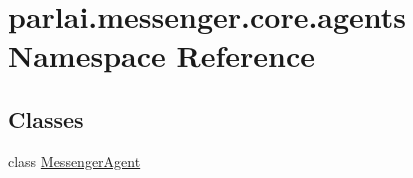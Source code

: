 \hypertarget{namespaceparlai_1_1messenger_1_1core_1_1agents}{}\section{parlai.\+messenger.\+core.\+agents Namespace Reference}
\label{namespaceparlai_1_1messenger_1_1core_1_1agents}
\subsection*{Classes}
\begin{DoxyCompactItemize}
\item 
class \hyperlink{classparlai_1_1messenger_1_1core_1_1agents_1_1MessengerAgent}{Messenger\+Agent}
\end{DoxyCompactItemize}
